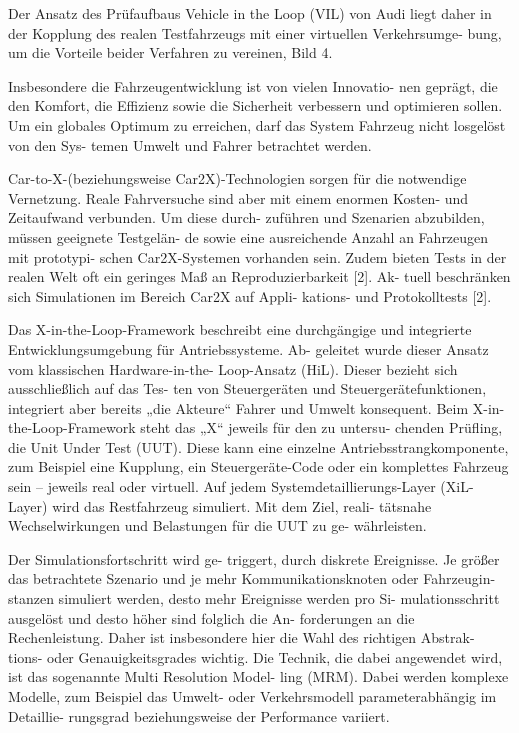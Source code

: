 Der Ansatz des Prüfaufbaus Vehicle in the Loop (VIL) von Audi liegt daher in der Kopplung des realen Testfahrzeugs mit einer virtuellen Verkehrsumge- bung, um die Vorteile beider Verfahren zu vereinen, Bild 4. \cite{bock2008vehicle}

Insbesondere die Fahrzeugentwicklung ist von vielen Innovatio- nen geprägt, die den Komfort, die Effizienz sowie die Sicherheit verbessern und optimieren sollen. Um ein globales Optimum zu erreichen, darf das System Fahrzeug nicht losgelöst von den Sys- temen Umwelt und Fahrer betrachtet werden. \cite{albers2010x}

Car-to-X-(beziehungsweise Car2X)-Technologien sorgen für die notwendige Vernetzung. Reale Fahrversuche sind aber mit einem enormen Kosten- und Zeitaufwand verbunden. Um diese durch- zuführen und Szenarien abzubilden, müssen geeignete Testgelän- de sowie eine ausreichende Anzahl an Fahrzeugen mit prototypi- schen Car2X-Systemen vorhanden sein. Zudem bieten Tests in der realen Welt oft ein geringes Maß an Reproduzierbarkeit [2]. Ak- tuell beschränken sich Simulationen im Bereich Car2X auf Appli- kations- und Protokolltests [2].\cite{albers2010x}

Das X-in-the-Loop-Framework beschreibt eine durchgängige und integrierte Entwicklungsumgebung für Antriebssysteme. Ab- geleitet wurde dieser Ansatz vom klassischen Hardware-in-the- Loop-Ansatz (HiL). Dieser bezieht sich ausschließlich auf das Tes- ten von Steuergeräten und Steuergerätefunktionen, integriert aber bereits „die Akteure“ Fahrer und Umwelt konsequent. Beim X-in- the-Loop-Framework steht das „X“ jeweils für den zu untersu- chenden Prüfling, die Unit Under Test (UUT). Diese kann eine einzelne Antriebsstrangkomponente, zum Beispiel eine Kupplung, ein Steuergeräte-Code oder ein komplettes Fahrzeug sein – jeweils real oder virtuell. Auf jedem Systemdetaillierungs-Layer (XiL-Layer) wird das Restfahrzeug simuliert. Mit dem Ziel, reali- tätsnahe Wechselwirkungen und Belastungen für die UUT zu ge- währleisten.\cite{albers2010x}

Der Simulationsfortschritt wird ge- triggert, durch diskrete Ereignisse. Je größer das betrachtete Szenario und je mehr Kommunikationsknoten oder Fahrzeugin- stanzen simuliert werden, desto mehr Ereignisse werden pro Si- mulationsschritt ausgelöst und desto höher sind folglich die An- forderungen an die Rechenleistung. Daher ist insbesondere hier die Wahl des richtigen Abstrak- tions- oder Genauigkeitsgrades wichtig. Die Technik, die dabei angewendet wird, ist das sogenannte Multi Resolution Model- ling (MRM). Dabei werden komplexe Modelle, zum Beispiel das Umwelt- oder Verkehrsmodell parameterabhängig im Detaillie- rungsgrad beziehungsweise der Performance variiert. \cite{albers2010x}

